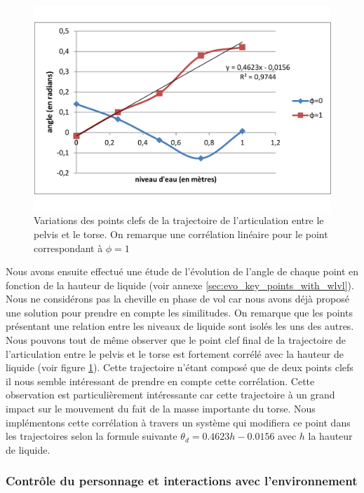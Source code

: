 \documentclass[runningheads,a4paper]{llncs}
\begin{document}
\begin{figure}[h]
\centering
\includegraphics[scale=0.27]{img_curve_pelvis_torso.pdf}
\caption{Variations des points clefs de la trajectoire de l'articulation entre le pelvis et le torse. On remarque une corrélation linéaire pour le point correspondant à $\phi=1$}
\label{fig:img_curve_pelvis_torso}
\end{figure}

Nous avons ensuite effectué une étude de l'évolution de l'angle de chaque point en fonction de la hauteur de liquide (voir annexe \ref{sec:evo_key_points_with_wlvl}). Nous ne considérons pas la cheville en phase de vol car nous avons déjà proposé une solution pour prendre en compte les similitudes. On remarque que les points présentant une relation entre les niveaux de liquide sont isolés les uns des autres. Nous pouvons tout de même observer que le point clef final de la trajectoire de l'articulation entre le pelvis et le torse est fortement corrélé avec la hauteur de liquide (voir figure \ref{fig:img_curve_pelvis_torso}). Cette trajectoire n'étant composé que de deux points clefs il nous semble intéressant de prendre en compte cette corrélation. Cette observation est particulièrement intéressante car cette trajectoire à un grand impact sur le mouvement du fait de la masse importante du torse. Nous implémentons cette corrélation à travers un système qui modifiera ce point dans les trajectoires selon la formule suivante $\theta_d=0.4623h-0.0156$ avec $h$ la hauteur de liquide.

\subsubsection{Contrôle du personnage et interactions avec l'environnement}
\end{document}
